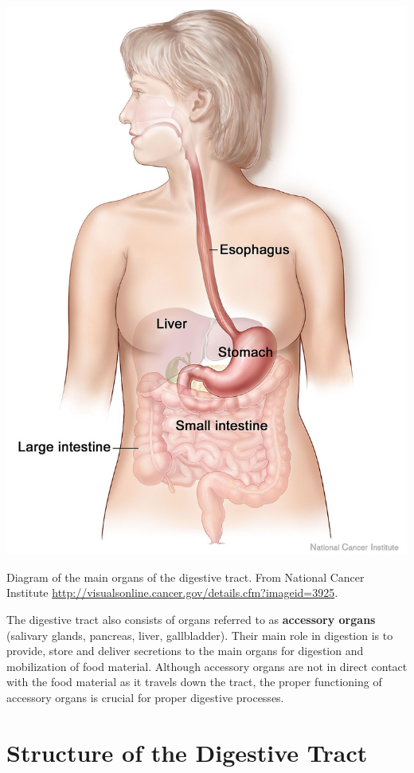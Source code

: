 \documentclass{tufte-handout}
\begin{document}
\begin{marginfigure}
\includegraphics{figures/digestive-tract.jpg}
\caption{Diagram of the main organs of the digestive tract.  From National Cancer Institute \url{http://visualsonline.cancer.gov/details.cfm?imageid=3925}.}
\end{marginfigure}

The digestive tract also consists of organs referred to as \textbf{accessory organs} (salivary glands, pancreas, liver, gallbladder). Their main role in digestion is to provide, store and deliver secretions to the main organs for digestion and mobilization of food material. Although accessory organs are not in direct contact with the food material as it travels down the tract, the proper functioning of accessory organs is crucial for proper digestive processes. 

\section{Structure of the Digestive Tract}
\end{document}
